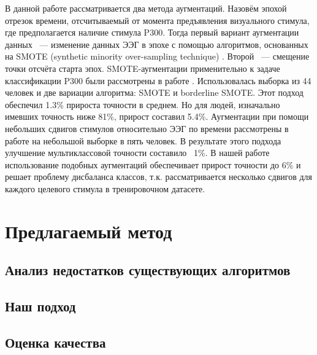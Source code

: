 \documentclass[12pt]{article}
\begin{document}
	В данной работе рассматривается два метода аугментаций. Назовём эпохой отрезок времени, отсчитываемый от момента предъявления визуального стимула, где предполагается наличие стимула P300. Тогда первый вариант аугментации данных ~--- изменение данных ЭЭГ в эпохе с помощью алгоритмов, основанных на SMOTE (synthetic minority over-sampling technique) \cite{smote}. Второй ~--- смещение точки отсчёта старта эпох. %
	SMOTE-аугментации применительно к задаче классификации P300 были рассмотрены в работе \cite{Lee2020}. Использовалась выборка из 44 человек и две вариации алгоритма: SMOTE и borderline SMOTE. Этот подход обеспечил 1.3\% прироста точности в среднем. Но для людей, изначально имевших точность ниже 81\%, прирост составил 5.4\%. Аугментации при помощи небольших сдвигов стимулов относительно ЭЭГ по времени рассмотрены в работе \cite{Krell2018DataAF}  на небольшой выборке в пять человек. В результате этого подхода улучшение мультиклассовой точности составило ~1\%. В нашей работе использование подобных аугментаций обеспечивает прирост точности до 6\% и решает проблему дисбаланса классов, т.к. рассматривается несколько сдвигов для каждого целевого стимула в тренировочном датасете.
	
	\newpage
	\section{Предлагаемый метод}
	
	
	\subsection{Анализ недостатков существующих алгоритмов}
	
	
	\subsection{Наш подход}
	
	\subsection{Оценка качества}
	
\end{document}
